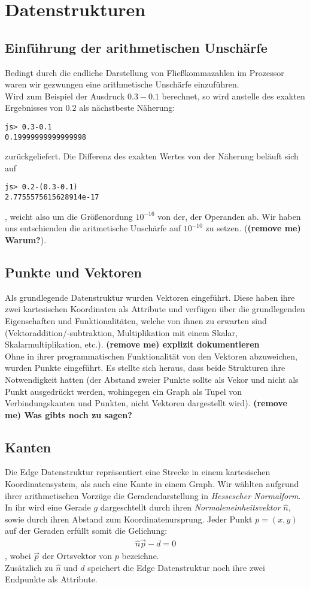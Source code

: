 \documentclass[a4paper,twocolumn]{report}
\newcommand{\lststyle}[1]{{\usefont{T1}{pcr}{m}{n}\small\selectfont#1}}
\begin{document}
\section{Datenstrukturen}

\subsection{Einführung der arithmetischen Unschärfe}
Bedingt durch die endliche Darstellung von Flie\ss kommazahlen im Prozessor waren wir gezwungen eine arithmetische
Unsch\"arfe einzuf\"uhren. \\
Wird zum Beispiel der Ausdruck $0.3-0.1$ berechnet, so wird anstelle des exakten Ergebnisses von $0.2$ 
als n\"achstbeste  Näherung:
\begin{lstlisting}
js> 0.3-0.1
0.19999999999999998
\end{lstlisting}
zur\"uckgeliefert. Die Differenz des exakten Wertes von der N\"aherung bel\"auft sich auf
\begin{lstlisting}
js> 0.2-(0.3-0.1)
2.7755575615628914e-17
\end{lstlisting}
, weicht also um die Gr\"o\ss enordung $10^{-16}$ von der, der Operanden ab.
Wir haben uns entschienden die aritmetische Unsch\"arfe auf $10^{-10}$ zu setzen. (\textbf{(remove me) Warum?}).
\subsection{Punkte und Vektoren}
Als grundlegende Datenstruktur wurden Vektoren eingef\"uhrt. Diese haben ihre zwei kartesischen Koordinaten als
Attribute und verf\"ugen \"uber die grundlegenden Eigenschaften und Funktionalit\"aten, welche von ihnen zu erwarten sind
(Vektoraddition/-subtraktion,
Multiplikation mit einem Skalar, Skalarmultiplikation, etc.). \textbf{(remove me) explizit dokumentieren}\\
Ohne in ihrer programmatischen Funktionalit\"at von den Vektoren abzuweichen, wurden Punkte eingef\"uhrt. Es stellte
sich heraus, dass beide Strukturen ihre Notwendigkeit hatten (der Abstand zweier Punkte sollte
als Vekor und 
nicht als Punkt ausgedr\"uckt werden, wohingegen ein Graph als Tupel von Verbindungskanten und Punkten, nicht Vektoren
dargestellt wird).
\textbf{(remove me) Was gibts noch zu sagen?}
\subsection{Kanten}
Die \lststyle{Edge} Datenstruktur repr\"asentiert eine  Strecke in einem kartesischen Koordinatensystem, als auch eine
Kante in einem Graph. Wir w\"ahlten aufgrund ihrer arithmetischen Vorz\"uge die Geradendarstellung in \emph{Hessescher
Normalform}. In ihr wird eine Gerade $g$ dargeschtellt durch ihren \emph{Normaleneinheitsvektor} $\widehat{n}$, sowie
durch ihren Abstand zum Koordinatenursprung. Jeder Punkt $p=(x,y)$ auf der Geraden erf\"ullt somit die Gelichung: 
\begin{align}
  \widehat{n}\vec{p}-d=0  
\end{align}
, wobei $\vec{p}$ der Ortsvektor von $p$ bezeichne.\\
Zus\"atzlich zu $\widehat{n}$ und $d$ speichert die \lststyle{Edge} Datenstruktur noch ihre zwei Endpunkte als
Attribute.
\end{document}
